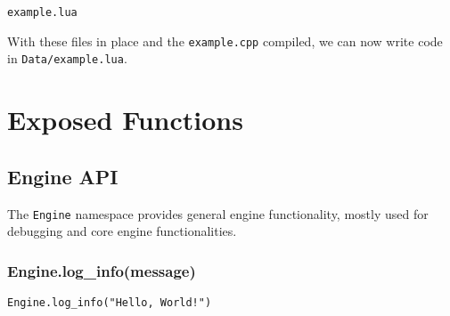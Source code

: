 \documentclass[12pt,a4paper]{article}
\begin{document}
\begin{lstlisting}[title=Data/res.list]
example.lua
\end{lstlisting}

With these files in place and the \texttt{example.cpp} compiled, we can now write code in \texttt{Data/example.lua}.

\pagebreak

\section{Exposed Functions}

\subsection{Engine API}

The \texttt{Engine} namespace provides general engine functionality, mostly used for debugging and core engine functionalities.

\subsubsection{Engine.log\_info(message)}

\begin{lstlisting}[language={[5.0]Lua},title=Data/example.lua]
Engine.log_info("Hello, World!")
\end{lstlisting}
\end{document}
